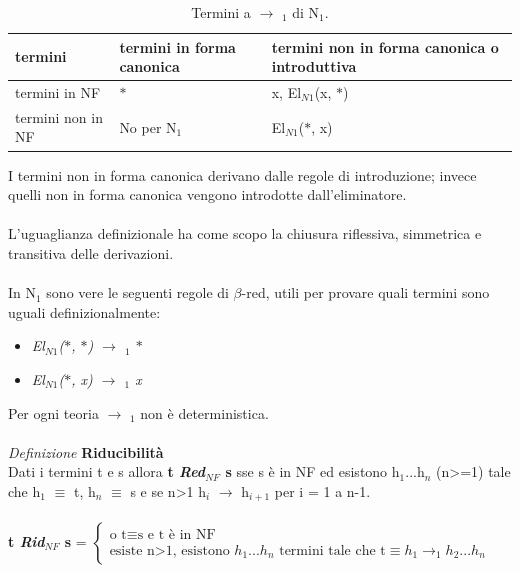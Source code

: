 \documentclass[10pt,a4paper, italian]{book}
\begin{document}
{{{\begin{table}[H]
\centering
\begin{tabularx}{\textwidth}{XXX}
\hline 
\rowcolor{orange}
{\color[HTML]{FFFFFF}\textbf{termini}} & {\color[HTML]{FFFFFF} \textbf{termini in forma canonica}} & {\color[HTML]{FFFFFF}\textbf{termini non in forma canonica o introduttiva}}\\
\hline\hline
termini in NF & $\ast$ & x, El$_{N1}$(x, $\ast$)\\
termini non in NF & No per N$_1$ & El$_{N1}$($\ast$, x)\\
\end{tabularx}
\caption{\label{tab:termini-NF-nonNF-N1}Termini a $\rightarrow$ $_1$ di N$_1$.} 
\end{table}
\noindent
I termini non in forma canonica  derivano dalle regole di introduzione; invece quelli non in forma canonica vengono introdotte dall'eliminatore.\\\\
L'uguaglianza definizionale ha come scopo la chiusura riflessiva, simmetrica e transitiva delle derivazioni.\\\\
In N$_1$ sono vere le seguenti regole di $\beta$-red, utili per provare quali termini sono uguali definizionalmente: 
\begin{itemize}
\item \textit{El$_{N1}$($\ast$, $\ast$) $\rightarrow$ $_1$ $\ast$}
\item \textit{El$_{N1}$($\ast$, x) $\rightarrow$ $_1$ x}
\end{itemize}
\noindent
Per ogni teoria  $\rightarrow$ $_1$ non \`e deterministica.
\\\\
\textit{Definizione} \textbf{Riducibilit\`a}\\
Dati i termini t e s allora \textbf{t \textit{Red$_{NF}$} s} sse s \`e in NF ed esistono h$_1$...h$_n$ (n>=1) tale che h$_1$ $\equiv$ t, h$_n$ $\equiv$ s e se n>1 h$_i$ $\rightarrow$ h$_{i+1}$ per i = 1 a n-1.\\\\
\textbf{t \textit{Rid$_{NF}$} s} =
$
\begin{cases}
\text{o t} \equiv \text{s e t è in NF} \\
\text{esiste n>1, esistono } h_1\text{...}h_n \text{ termini tale che t} \equiv h_1 \rightarrow _1 h_2 \text{...}h_n
\end{cases}
$
\\\\
}}}
\end{document}
